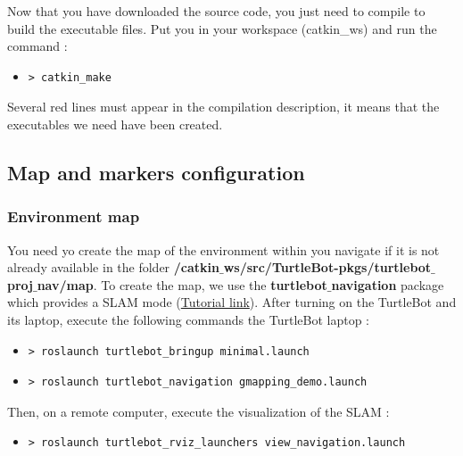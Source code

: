 \documentclass[10pt,a4paper]{article}
\begin{document}
Now that you have downloaded the source code, you just need to compile to build the executable files. Put you in your workspace (catkin\_ws) and run the command : 

\begin{itemize}
\item[]  \begin{verbatim}> catkin_make \end{verbatim}
\end{itemize}

Several red lines must appear in the compilation description, it means that the executables we need have been created.

\subsection{Map and markers configuration}

\subsubsection{Environment map}

You need yo create the map of the environment within you navigate if it is not already available in the folder \textbf{/catkin$\_$ws/src/TurtleBot-pkgs/turtlebot$\_$proj$\_$nav/map}. To create the map, we use the \textbf{turtlebot$\_$navigation} package which provides a SLAM mode (\href{http://wiki.ros.org/turtlebot_navigation/Tutorials/indigo/Build%20a%20map%20with%20SLAM}{Tutorial link}). After turning on the TurtleBot and its laptop, execute the following commands the TurtleBot laptop :

\begin{itemize}
\item[]  \begin{verbatim}> roslaunch turtlebot_bringup minimal.launch \end{verbatim}
\item[]  \begin{verbatim}> roslaunch turtlebot_navigation gmapping_demo.launch \end{verbatim}
\end{itemize}

Then, on a remote computer, execute the visualization of the SLAM :

\begin{itemize}
\item[]  \begin{verbatim}> roslaunch turtlebot_rviz_launchers view_navigation.launch \end{verbatim}
\end{itemize}
\end{document}
